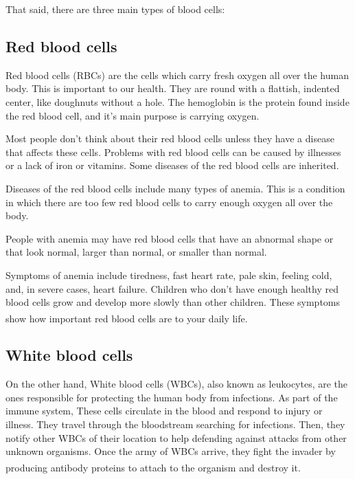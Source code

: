 That said, there are three main types of blood cells:

\subsection{Red blood cells}

Red blood cells (RBCs) are the cells which carry fresh oxygen all over the human body. This is important to our health. They are round with a flattish, indented center, like doughnuts without a hole. 
The hemoglobin is the protein found inside the red blood cell, and it's main purpose is carrying oxygen.

Most people don't think about their red blood cells unless they have a disease that affects these cells. Problems with red blood cells can be caused by illnesses or a lack of iron or vitamins. Some diseases of the red blood cells are inherited.

Diseases of the red blood cells include many types of anemia. This is a condition in which there are too few red blood cells to carry enough oxygen all over the body.

\newpage

People with anemia may have red blood cells that have an abnormal shape or that look normal, larger than normal, or smaller than normal.

Symptoms of anemia include tiredness, fast heart rate, pale skin, feeling cold, and, in severe cases, heart failure. Children who don't have enough healthy red blood cells grow and develop more slowly than other children. These symptoms show how important red blood cells are to your daily life. \textsuperscript{\cite{Department_2022_rochester}}

\subsection{White blood cells}

On the other hand, White blood cells (WBCs), also known as leukocytes, are the ones responsible for protecting the human body from infections. As part of the immune system, These cells circulate in the blood and respond to injury or illness. They travel through the bloodstream searching for infections. Then, they notify other WBCs of their location to help defending against attacks from other unknown organisms. Once the army of WBCs arrive, they fight the invader by producing antibody proteins to attach to the organism and destroy it. \textsuperscript{\cite{Attacking_Any_Unknown_2022_clevelandclinic}}

